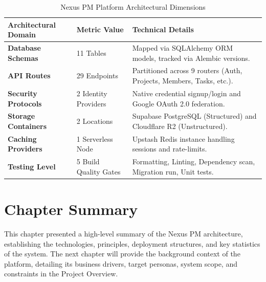 \begin{table}[h!]
\centering
\small
\renewcommand{\arraystretch}{1.4}
\begin{tabularx}{\textwidth}{>{\bfseries\color{primary}}l l X}
    \toprule[1.5pt]
    \rowcolor{primary!5}
    \textbf{\color{primary}Architectural Domain} & \textbf{\color{primary}Metric Value} & \textbf{\color{primary}Technical Details} \\
    \midrule
    Database Schemas & 11 Tables & Mapped via SQLAlchemy ORM models, tracked via Alembic versions. \\
    API Routes & 29 Endpoints & Partitioned across 9 routers (Auth, Projects, Members, Tasks, etc.). \\
    Security Protocols & 2 Identity Providers & Native credential signup/login and Google OAuth 2.0 federation. \\
    Storage Containers & 2 Locations & Supabase PostgreSQL (Structured) and Cloudflare R2 (Unstructured). \\
    Caching Providers & 1 Serverless Node & Upstash Redis instance handling sessions and rate-limits. \\
    Testing Level & 5 Build Quality Gates & Formatting, Linting, Dependency scan, Migration run, Unit tests. \\
    \bottomrule[1.5pt]
\end{tabularx}
\caption{Nexus PM Platform Architectural Dimensions}
\label{tab:architecture_statistics}
\end{table}

\section{Chapter Summary}
This chapter presented a high-level summary of the Nexus PM architecture, establishing the technologies, principles, deployment structures, and key statistics of the system. The next chapter will provide the background context of the platform, detailing its business drivers, target personas, system scope, and constraints in the Project Overview.
